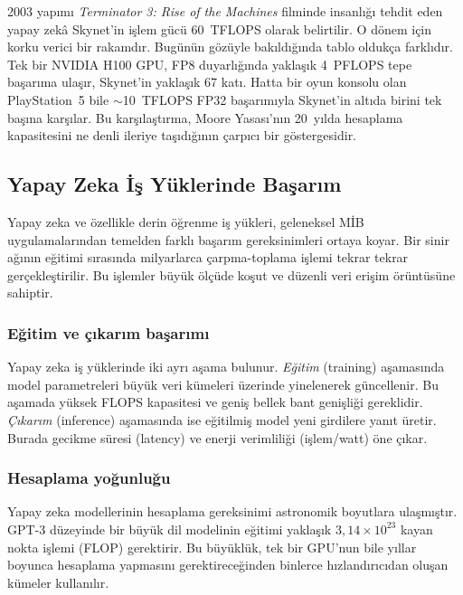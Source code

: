 \begin{bilginot}
2003 yapımı \emph{Terminator 3: Rise of the Machines} filminde insanlığı tehdit eden yapay zekâ Skynet'in işlem gücü 60~TFLOPS olarak belirtilir. O dönem için korku verici bir rakamdır. Bugünün gözüyle bakıldığında tablo oldukça farklıdır. Tek bir NVIDIA H100 GPU, FP8 duyarlığında yaklaşık 4~PFLOPS tepe başarıma ulaşır, Skynet'in yaklaşık 67 katı. Hatta bir oyun konsolu olan PlayStation~5 bile $\sim$10~TFLOPS FP32 başarımıyla Skynet'in altıda birini tek başına karşılar. Bu karşılaştırma, Moore Yasası'nın 20~yılda hesaplama kapasitesini ne denli ileriye taşıdığının çarpıcı bir göstergesidir.
\end{bilginot}

\subsection{Yapay Zeka İş Yüklerinde Başarım}
\label{subsec:yz-basarim}

Yapay zeka ve özellikle derin öğrenme iş yükleri, geleneksel MİB uygulamalarından temelden farklı başarım gereksinimleri ortaya koyar. Bir sinir ağının eğitimi sırasında milyarlarca çarpma-toplama işlemi tekrar tekrar gerçekleştirilir. Bu işlemler büyük ölçüde koşut ve düzenli veri erişim örüntüsüne sahiptir.

\subsubsection*{Eğitim ve çıkarım başarımı}
Yapay zeka iş yüklerinde iki ayrı aşama bulunur. \emph{Eğitim} (training) aşamasında model parametreleri büyük veri kümeleri üzerinde yinelenerek güncellenir. Bu aşamada yüksek FLOPS kapasitesi ve geniş bellek bant genişliği gereklidir. \emph{Çıkarım} (inference) aşamasında ise eğitilmiş model yeni girdilere yanıt üretir. Burada gecikme süresi (latency) ve enerji verimliliği (işlem/watt) öne çıkar.

\subsubsection*{Hesaplama yoğunluğu}
Yapay zeka modellerinin hesaplama gereksinimi astronomik boyutlara ulaşmıştır. GPT-3 düzeyinde bir büyük dil modelinin eğitimi yaklaşık $3{,}14 \times 10^{23}$ kayan nokta işlemi (FLOP) gerektirir. Bu büyüklük, tek bir GPU'nun bile yıllar boyunca hesaplama yapmasını gerektireceğinden binlerce hızlandırıcıdan oluşan kümeler kullanılır.

